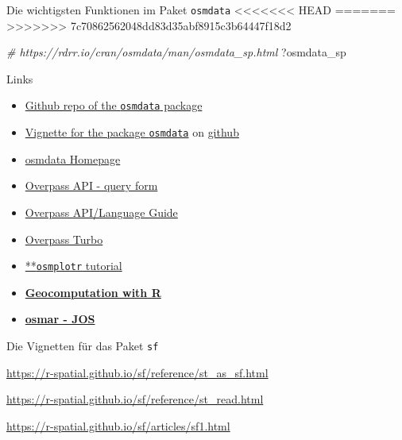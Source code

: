 \documentclass[ignorenonframetext,]{beamer}
\newenvironment{Shaded}{\begin{snugshade}}{\end{snugshade}}
\newcommand{\CommentTok}[1]{\textcolor[rgb]{0.56,0.35,0.01}{\textit{#1}}}
\newcommand{\NormalTok}[1]{#1}
\begin{document}
\begin{frame}[fragile]{Die wichtigsten Funktionen im Paket
\texttt{osmdata}}
<<<<<<< HEAD
=======
\protect\hypertarget{die-wichtigsten-funktionen-im-paket-osmdata}{}
>>>>>>> 7c70862562048dd83d35abf8915c3b64447f18d2

\begin{Shaded}
\begin{Highlighting}[]
\CommentTok{# https://rdrr.io/cran/osmdata/man/osmdata_sp.html}
\NormalTok{?osmdata_sp}
\end{Highlighting}
\end{Shaded}

\end{frame}

\begin{frame}[fragile]{Links}
\protect\hypertarget{links}{}

\begin{itemize}
\item
  \href{https://github.com/ropensci/osmdata}{Github repo of the
  \texttt{osmdata} package}
\item
  \href{https://cran.r-project.org/web/packages/osmdata/vignettes/osmdata.html}{Vignette
  for the package \texttt{osmdata}} on
  \href{https://github.com/ropensci/osmdata/blob/master/vignettes/osmdata.Rmd}{github}
\item
  \href{https://ropensci.github.io/osmdata/}{osmdata Homepage}
\item
  \href{http://overpass-api.de/query_form.html}{Overpass API - query
  form}
\item
  \href{https://wiki.openstreetmap.org/wiki/DE:Overpass_API/Language_Guide}{Overpass
  API/Language Guide}
\item
  \href{https://wiki.openstreetmap.org/wiki/DE:Overpass_turbo}{Overpass
  Turbo} 
\item
  \href{https://ropensci.org/tutorials/osmplotr_tutorial/}{**\texttt{osmplotr}
  tutorial}
\item
  \href{https://bookdown.org/robinlovelace/geocompr/}{\textbf{Geocomputation
  with R}}
\item
  \href{https://www.theoj.org/joss-papers/joss.00305/10.21105.joss.00305.pdf}{\textbf{osmar
  - JOS}}
\end{itemize}

\begin{block}{Die Vignetten für das Paket \texttt{sf}}

\url{https://r-spatial.github.io/sf/reference/st_as_sf.html}

\url{https://r-spatial.github.io/sf/reference/st_read.html}

\url{https://r-spatial.github.io/sf/articles/sf1.html}

\end{block}

\end{frame}
\end{document}
